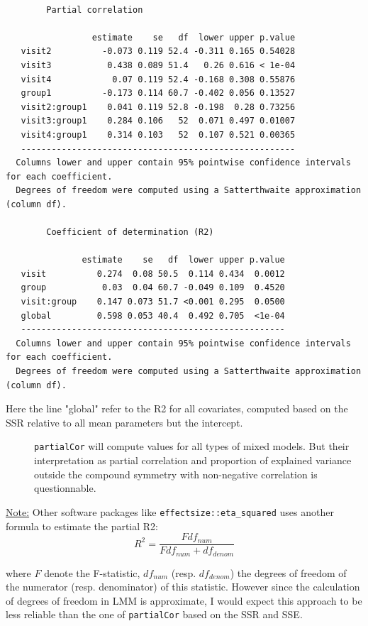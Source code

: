 \documentclass[12pt]{article}
\newcommand\Warning[1][3ex]{%
\renewcommand\stacktype{L}%
\scaleto{\stackon[1.3pt]{\color{red}$\triangle$}{\tiny\bfseries !}}{#1}%
\xspace
}
\begin{document}
\begin{verbatim}

		Partial correlation 

                 estimate    se   df  lower upper p.value
   visit2          -0.073 0.119 52.4 -0.311 0.165 0.54028
   visit3           0.438 0.089 51.4   0.26 0.616 < 1e-04
   visit4            0.07 0.119 52.4 -0.168 0.308 0.55876
   group1          -0.173 0.114 60.7 -0.402 0.056 0.13527
   visit2:group1    0.041 0.119 52.8 -0.198  0.28 0.73256
   visit3:group1    0.284 0.106   52  0.071 0.497 0.01007
   visit4:group1    0.314 0.103   52  0.107 0.521 0.00365
   ------------------------------------------------------ 
  Columns lower and upper contain 95% pointwise confidence intervals for each coefficient.
  Degrees of freedom were computed using a Satterthwaite approximation (column df). 

		Coefficient of determination (R2)

               estimate    se   df  lower upper p.value
   visit          0.274  0.08 50.5  0.114 0.434  0.0012
   group           0.03  0.04 60.7 -0.049 0.109  0.4520
   visit:group    0.147 0.073 51.7 <0.001 0.295  0.0500
   global         0.598 0.053 40.4  0.492 0.705  <1e-04
   ---------------------------------------------------- 
  Columns lower and upper contain 95% pointwise confidence intervals for each coefficient.
  Degrees of freedom were computed using a Satterthwaite approximation (column df).
\end{verbatim}

Here the line "global" refer to the R2 for all covariates, computed
based on the SSR relative to all mean parameters but the intercept.
\begin{description}
\item[{\Warning}] \texttt{partialCor} will compute values for all types of mixed
models. But their interpretation as partial correlation and
proportion of explained variance outside the compound symmetry with
non-negative correlation is questionnable.
\end{description}

\bigskip

\uline{Note:} Other software packages like \texttt{effectsize::eta\_squared} uses
another formula to estimate the partial R2:
\[ R^2=\frac{F df_{num}}{F df_{num} + df_{denom}} \]

where \(F\) denote the F-statistic, \(df_{num}\)
(resp. \(df_{denom}\)) the degrees of freedom of the numerator
(resp. denominator) of this statistic. However since the calculation
of degrees of freedom in LMM is approximate, I would expect this
approach to be less reliable than the one of \texttt{partialCor} based on the
SSR and SSE.
\end{document}

